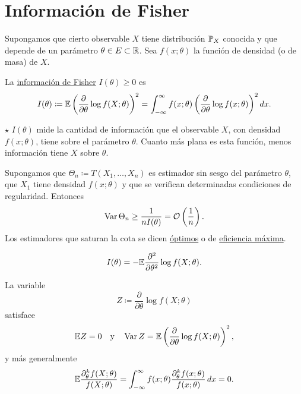 \section{Información de Fisher}

Supongamos que cierto observable $X$ tiene distribución $\mathbb{P}_X$ conocida y que depende de un parámetro $\theta \in E \subset \mathbb{R}$. Sea $f(x;\theta)$ la función de densidad (o de masa) de $X$.

\begin{definicion}[1]
La \underline{información de Fisher} $I(\theta) \ge 0$ es
\[
  I(\theta) \coloneqq \mathbb{E}\left(\frac{\partial}{\partial\theta} \log f(X;\theta)\right)^2 = \int_{-\infty}^{\infty} f(x;\theta)\left(\frac{\partial}{\partial\theta} \log f(x;\theta)\right)^2 dx.
\]
\end{definicion} 

\noindent $\star$ $I(\theta)$ mide la cantidad de información que el observable $X$, con densidad $f(x;\theta)$, tiene sobre el parámetro $\theta$. Cuanto más plana es esta función, menos información tiene $X$ sobre $\theta$.

\begin{teorema}
Supongamos que $\Theta_n \coloneqq T(X_1, \dots, X_n)$ es estimador sin sesgo del parámetro $\theta$, que $X_1$ tiene densidad $f(x;\theta)$ y que se verifican determinadas condiciones de regularidad. Entonces
\[
  \operatorname{Var}\Theta_n \ge \frac{1}{n I(\theta)} = \mathcal{O}\left(\frac{1}{n}\right).
\]
Los estimadores que saturan la cota se dicen \underline{óptimos} o de \underline{eficiencia máxima}.
\end{teorema}

\begin{proposicion}[5]
\[
  I(\theta) = -\mathbb{E}\frac{\partial^2}{\partial\theta^2}\log f(X;\theta).
\]
\end{proposicion}

\begin{proposicion}[6]
La variable
\[
  Z \coloneqq \frac{\partial}{\partial\theta}\log f(X;\theta)
\]
satisface
\[
  \mathbb{E} Z = 0 \quad \text{y} \quad \operatorname{Var} Z = \mathbb{E}\left(\frac{\partial}{\partial\theta}\log f(X;\theta)\right)^2,
\]
y más generalmente
\[
  \mathbb{E}\frac{\partial_\theta^k f(X;\theta)}{f(X;\theta)} = \int_{-\infty}^{\infty} f(x;\theta)\frac{\partial_\theta^k f(x;\theta)}{f(x;\theta)}\,dx = 0.
\]
\end{proposicion}

